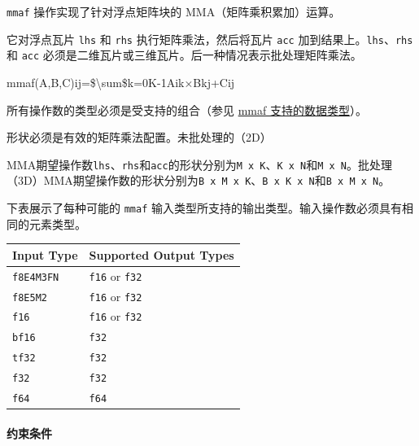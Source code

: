 \documentclass{article}
\begin{document}
\texttt{mmaf} 操作实现了针对浮点矩阵块的 MMA（矩阵乘积累加）运算。

它对浮点瓦片 \texttt{lhs} 和 \texttt{rhs} 执行矩阵乘法，然后将瓦片 \texttt{acc} 加到结果上。\texttt{lhs}、\texttt{rhs} 和 \texttt{acc} 必须是二维瓦片或三维瓦片。后一种情况表示批处理矩阵乘法。


mmaf(A,B,C)ij=\$\textbackslash{}sum\$k=0K-1Aik×Bkj+Cij

所有操作数的类型必须是受支持的组合（参见 \href{https://docs.nvidia.com/cuda/tile-ir/latest/sections/operations.html#table-cuda-tile-mmaf-0}{mmaf 支持的数据类型}）。


形状必须是有效的矩阵乘法配置。未批处理的（2D）

MMA期望操作数\texttt{lhs}、\texttt{rhs}和\texttt{acc}的形状分别为\texttt{M x K}、\texttt{K x N}和\texttt{M x N}。批处理（3D）MMA期望操作数的形状分别为\texttt{B x M x K}、\texttt{B x K x N}和\texttt{B x M x N}。


下表展示了每种可能的 \texttt{mmaf} 输入类型所支持的输出类型。输入操作数必须具有相同的元素类型。


\begin{longtable}{l|l}
\hline
Input Type & Supported Output Types \\ \hline
\texttt{f8E4M3FN} & \texttt{f16} or \texttt{f32} \\ \hline
\texttt{f8E5M2} & \texttt{f16} or \texttt{f32} \\ \hline
\texttt{f16} & \texttt{f16} or \texttt{f32} \\ \hline
\texttt{bf16} & \texttt{f32} \\ \hline
\texttt{tf32} & \texttt{f32} \\ \hline
\texttt{f32} & \texttt{f32} \\ \hline
\texttt{f64} & \texttt{f64} \\ \hline
\end{longtable}


\paragraph{约束条件}
\end{document}
